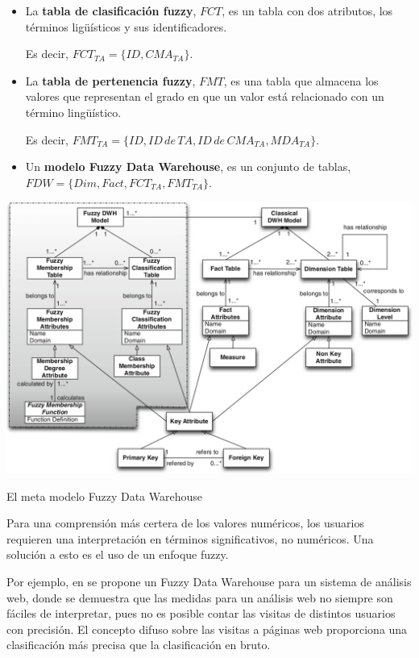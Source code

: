 \documentclass{fancyslides}
\begin{document}
\begin{frame}
\misc
{
\begin{itemize}
  \item \justifying La \textbf{tabla de clasificación fuzzy}, $FCT$, es un tabla con dos atributos, los términos ligüísticos y sus identificadores.
  
  Es decir, $FCT_{TA} = \{ ID, CMA_{TA} \}$.
  \item \justifying La \textbf{tabla de pertenencia fuzzy}, $FMT$, es una tabla que almacena los valores que representan el grado en que un valor está relacionado con un término lingüístico.
  
  Es decir, $FMT_{TA} = \{ ID, ID \, de \, TA, ID \, de \, CMA_{TA}, MDA_{TA} \}$.
  
  \item \justifying Un \textbf{modelo Fuzzy Data Warehouse}, es un conjunto de tablas, $FDW = \{Dim, Fact, FCT_{TA}, FMT_{TA} \}$.
\end{itemize}
}
\end{frame}

\begin{frame}
\misc
{

\begin{center}
\includegraphics[scale=0.25]{fuzzy2}

El meta modelo Fuzzy Data Warehouse
\end{center}

}
\end{frame}

\begin{frame}
\misc
{
\justifying Para una comprensión más certera de los valores numéricos, los usuarios requieren una interpretación en términos significativos, no numéricos.
Una solución a esto es el uso de un enfoque fuzzy.

Por ejemplo, en \cite{Fasel09} se propone un Fuzzy Data Warehouse para un sistema de análisis web, donde se demuestra que las medidas para un análisis web no siempre son fáciles de interpretar, pues no es posible contar las visitas de distintos usuarios con precisión.
El concepto difuso sobre las visitas a páginas web proporciona una clasificación más precisa que la clasificación en bruto.
}
\end{frame}
\end{document}
